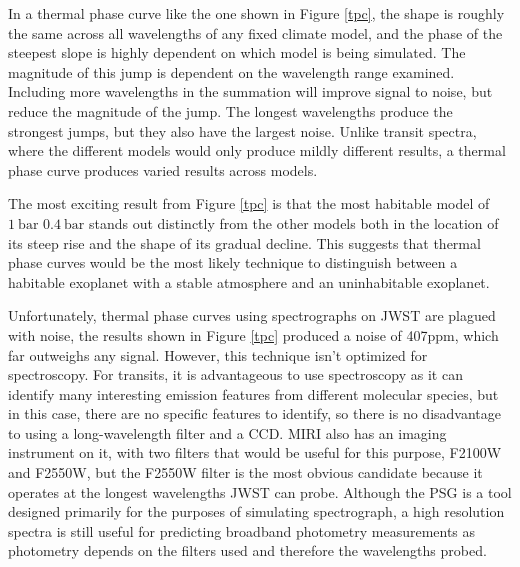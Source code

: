 In a thermal phase curve like the one shown in Figure \ref{tpc}, the shape is
 roughly the same across all wavelengths of any fixed climate model, and the
 phase of the steepest slope is highly dependent on which model is being
 simulated. The magnitude of this jump is dependent
 on the wavelength range examined. Including more wavelengths in the summation
 will improve signal to noise, but reduce the magnitude of the jump. The longest
 wavelengths produce the strongest jumps, but they also have the largest noise.
 Unlike transit spectra, where the different models would only produce mildly
 different results, a thermal phase curve produces varied results across models.

The most exciting result from Figure \ref{tpc} is that the most habitable model
 of $\SI{1}{\bar}$  $\SI{0.4}{\bar}$  stands out distinctly from
 the other models
 both in the location of its steep rise and the shape of its gradual decline.
 This suggests that thermal phase curves would be the most likely technique to
 distinguish between a habitable exoplanet with a stable atmosphere and an
 uninhabitable exoplanet.

Unfortunately, thermal phase curves using spectrographs on JWST are plagued with
 noise, the results shown in Figure \ref{tpc} produced a noise of 407ppm,
 which far outweighs any signal. However, this technique isn't optimized for
 spectroscopy. For transits, it is advantageous to use spectroscopy as it can
 identify many interesting emission features from different molecular species,
 but in this case, there are no specific features to identify, so there is
 no disadvantage to using a long-wavelength filter and a CCD. MIRI also has an
 imaging instrument on it, with two filters that would be useful for
 this purpose, F2100W and F2550W, but the F2550W filter is the most obvious
 candidate because it operates at the longest wavelengths JWST can probe.
 Although the PSG is a tool designed primarily for the purposes of simulating
 spectrograph, a high resolution spectra is still useful for predicting
 broadband photometry measurements as photometry depends on the filters used
 and therefore the wavelengths probed.